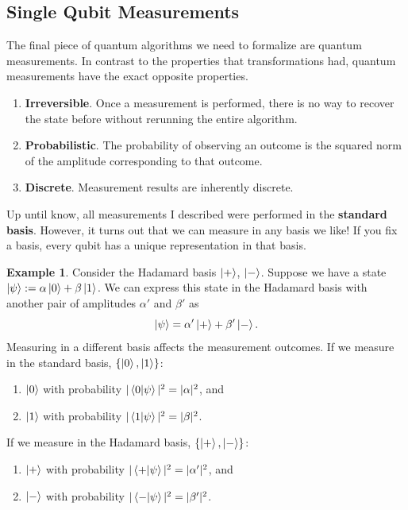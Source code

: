 \documentclass[letterpaper, 12pt]{article}
\newcommand{\1}{\mathds{1}}	%
\theoremstyle{definition}
\newtheorem{example}[theorem]{Example}
\begin{document}
\newpage

\subsection{Single Qubit Measurements}

The final piece of quantum algorithms we need to formalize are quantum measurements. In contrast to the properties that transformations had, quantum measurements have the exact opposite properties. 
\begin{enumerate}
    \item \textbf{Irreversible}. Once a measurement is performed, there is no way to recover the state before without rerunning the entire algorithm. 
    \item \textbf{Probabilistic}. The probability of observing an outcome is the squared norm of the amplitude corresponding to that outcome. 
    \item \textbf{Discrete}. Measurement results are inherently discrete. 
\end{enumerate}

Up until know, all measurements I described were performed in the \textbf{standard basis}. However, it turns out that we can measure in any basis we like! If you fix a basis, every qubit has a unique representation in that basis. 

\begin{example}
    Consider the Hadamard basis $\ket{+}$, $\ket{-}$. Suppose we have a state $\ket{\psi} := \alpha \ket{0} + \beta \ket{1}$. We can express this state in the Hadamard basis with another pair of amplitudes $\alpha'$ and $\beta'$ as 
    \begin{equation}
        \ket{\psi} = \alpha' \ket{+} + \beta' \ket{-}.
    \end{equation}
    Measuring in a different basis affects the measurement outcomes. If we measure in the standard basis, $\{\ket{0}, \ket{1}\}$:
    \begin{enumerate}
        \item $\ket{0}$ with probability $| \braket{0|\psi} | ^2 = |\alpha|^2$, and 
        \item $\ket{1}$ with probability $| \braket{1|\psi} | ^2 = |\beta|^2$.
    \end{enumerate}
    If we measure in the Hadamard basis, $\{\ket{+}, \ket{-}\}$:
    \begin{enumerate}
        \item $\ket{+}$ with probability $| \braket{+|\psi} | ^2 = |\alpha'|^2$, and 
        \item $\ket{-}$ with probability $| \braket{-|\psi} | ^2 = |\beta'|^2$.
    \end{enumerate}
\end{example}
\end{document}
